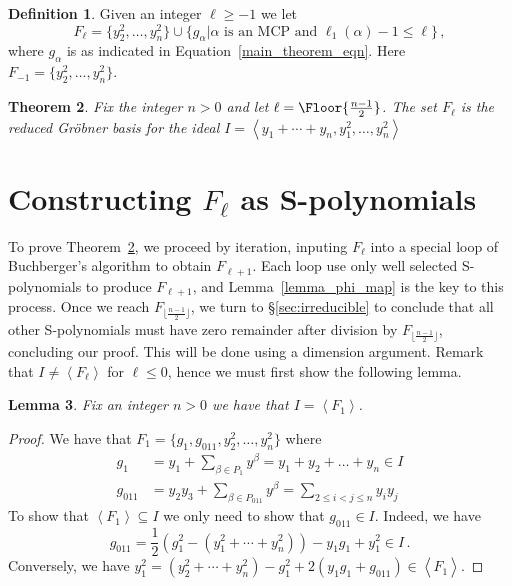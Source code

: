 \documentclass[12pt,reqno]{amsart}
\theoremstyle{plain}
\newtheorem{theorem}{Theorem}[section]
\newtheorem{lemma}[theorem]{Lemma}
\theoremstyle{definition}
\newtheorem{definition}[theorem]{Definition}
\DeclarePairedDelimiter\Floor\lfloor\rfloor
\DeclareMathOperator{\la}{\langle}
\DeclareMathOperator{\ra}{\rangle}
\DeclareMathOperator{\sube}{\subseteq}
\begin{document}
\begin{definition} \label{F_ell}
	Given an integer $\ell \ge -1$ we let
	\begin{equation*}
		F_\ell = \big\{ y^2_2, \dots, y^2_n\big\} \cup \big\{ g_{\alpha} \big|  \alpha \text{ is an MCP and } \ell_1(\alpha)-1 \leq \ell \big\} \,,
	\end{equation*}
	where $g_\alpha$ is as indicated in Equation~\eqref{main_theorem_eqn}. Here $F_{-1}= \big\{ y^2_2, \dots, y^2_n\big\}$.
\end{definition}
\begin{theorem} 
\label{main_theorem2}
    Fix the integer $n>0$ and let $\ell = \Floor{\frac{n-1}{2}}$. The set $F_\ell$ is the reduced Gr\"obner basis for the ideal $I = \la y_1 + \cdots + y_n, y_1^2, \dots, y_n^2 \ra$
    \end{theorem}

\section{\label{proof}Constructing $F_\ell$ as S-polynomials}
To prove Theorem~\ref{main_theorem2}, we proceed by iteration, inputing $F_\ell$ into a special loop of Buchberger's algorithm to obtain $F_{\ell +1}$.
Each  loop use only well selected  S-polynomials to produce $F_{\ell +1}$, and Lemma~\ref{lemma_phi_map} is the key to this process.
Once we reach $F_{ \lfloor \frac{n-1}{2} \rfloor}$, we turn to  \S\ref{sec:irreducible} to conclude that all other S-polynomials must have zero remainder  after division by $F_{ \lfloor \frac{n-1}{2} \rfloor}$, concluding our proof. This will be done using a dimension argument.
Remark that $I\ne \la F_\ell \ra$ for $\ell\le 0$, hence we must first show the following lemma.
\begin{lemma} \label{F_ellsequence}
	Fix an integer $n>0$ we have that $I=\la F_1\ra$.
\end{lemma}
\begin{proof} We have that $F_1 = \{g_1, g_{011}, y_2^2, \dots, y_n^2 \}$ where
 	\begin{align*}
 		g_{1} &= y_1 + \sum_{\beta \in P_{1}} y^{\beta} = y_1 + y_2 + \dots + y_n \in I\\
 		g_{011} &= y_2y_3 + \sum_{\beta \in P_{011}}y^\beta = \sum_{2 \leq i < j \leq n}y_iy_j 
	\end{align*}
	To show that {$\la F_1 \ra \sube I $} we only need to show that $g_{011} \in I$. Indeed, we have
	$$  g_{011} = \frac{1}{2}(g_1^2 - (y_1^2 + \cdots +y_n^2)) - y_1g_1 + y_1^2  \in I\,.$$
	Conversely, we have   $ y_1^2 =(y_2^2 + \cdots +y_n^2) -g_1^2  + 2(y_1g_1 + g_{011}) \in \la F_1 \ra$.
\end{proof}
\end{document}
